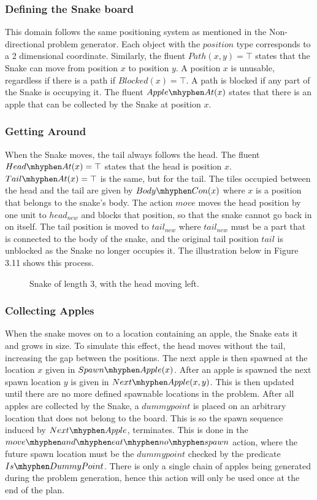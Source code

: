 \subsubsection{Defining the Snake board}
This domain follows the same positioning system as mentioned in the Non-directional problem generator. Each object with the $position$ type corresponds to a 2 dimensional coordinate. Similarly, the fluent $Path(x, y) = \top$ states that the Snake can move from position $x$ to position $y$. A position $x$ is unusable, regardless if there is a path if $Blocked(x) = \top$. A path is blocked if any part of the Snake is occupying it. The fluent $Apple\mhyphen At(x)$ states that there is an apple that can be collected by the Snake at position $x$. 

\subsubsection{Getting Around}
When the Snake moves, the tail always follows the head. The fluent $Head\mhyphen At(x) = \top$ states that the head is position $x$. $Tail\mhyphen At(x) = \top$ is the same, but for the tail. The tiles occupied between the head and the tail are given by $Body\mhyphen Con(x)$ where $x$ is a position that belongs to the snake's body. The action 
$move$ moves the head position by one unit to $head_{new}$ and blocks that position, so that the snake cannot go back in on itself. The tail position is moved to $tail_{new}$ where $tail_{new}$ must be a part that is connected to the body of the snake, and the original tail position $tail$ is unblocked as the Snake no longer occupies it. The illustration below in Figure 3.11 shows this process.

\begin{figure}[h!]
    \caption{Snake of length 3, with the head moving left.}
\end{figure}


\subsubsection{Collecting Apples}
When the snake moves on to a location containing an apple, the Snake eats it and grows in size. To simulate this effect, the head moves without the tail, increasing the gap between the positions. The next apple is then spawned at the location $x$ given in $Spawn\mhyphen Apple(x)$. After an apple is spawned the next spawn location $y$ is given in $Next\mhyphen Apple(x, y)$. This is then updated until there are no more defined spawnable locations in the problem. After all apples are collected by the Snake, a $dummypoint$ is placed on an arbitrary location that does not belong to the board. This is so the spawn sequence induced by $Next\mhyphen Apple$, terminates. This is done in the $move\mhyphen and\mhyphen eat\mhyphen no\mhyphen spawn$ action, where the future spawn location must be the $dummypoint$ checked by the predicate $Is\mhyphen DummyPoint$. There is only a single chain of apples being generated during the problem generation, hence this action will only be used once at the end of the plan.

